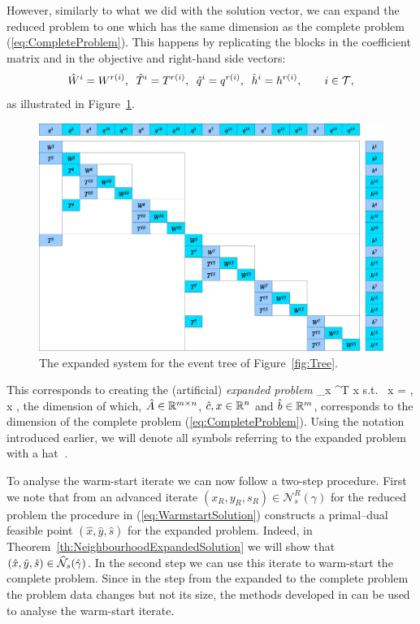 However, similarly to what we did with the solution vector, 
we can expand the reduced problem to one which has the same dimension 
as the complete problem (\ref{eq:CompleteProblem}). This happens by replicating
the blocks in the coefficient matrix and in the objective and right-hand 
side vectors:
\[
  \hat W^i = W^{r(i)},\;\; \hat T^i = T^{r(i)},\;\;
  \hat q^i = q^{r(i)},\;\; \hat h^i = h^{r(i)}, \qquad i \in \mathcal{T},
\]
as illustrated in Figure~\ref{fig:ExpandedSystem}.
%
\begin{figure}[ht]
  \begin{center}
    \includegraphics[scale=.49]{figures/expandedsystem.eps}
    \caption{The expanded system for the event tree of Figure~\ref{fig:Tree}.}
    \label{fig:ExpandedSystem}
  \end{center}
  \vspace{-3ex}
\end{figure}

This corresponds to creating the (artificial) {\em expanded problem}
\be \label{eq:ExpandedProblem}
\min_x\; ^T x \;\quad \mbox{s.t. }\;  x = ,
    \; x ,
\ee
the dimension of which, $\hat{A} \in \mathbb{R}^{m\times n}$, 
$\hat{c}, x \in \mathbb{R}^{n}$ and $\hat{b} \in \mathbb{R}^{m}$,
corresponds to the dimension of the complete problem 
(\ref{eq:CompleteProblem}).
Using the notation introduced earlier, we will denote 
all symbols referring to the expanded problem with a hat $\hat{\ }$.

To analyse the warm-start iterate we can now follow a two-step
procedure. First we note that from an advanced iterate 
$(x_R, y_R,  s_R)\in\mathcal{N}^R_s(\gamma)$ for the reduced
problem the procedure in (\ref{eq:WarmstartSolution}) constructs a
primal--dual feasible point $(\hat{x}, \hat{y}, \hat{s})$ for the 
expanded problem. Indeed,
in Theorem~\ref{th:NeighbourhoodExpandedSolution} we will show that
$(\hat{x}, \hat{y}, \hat{s})\in\widehat{\mathcal{N}}_s(\hat{\gamma})$.
In the second step we
can use this iterate to warm-start the complete problem. Since in the
step from the expanded to the complete problem the problem data
changes but not its size, the methods developed in
\cite{GondzioGrothey03,YildirimWright} can be used to analyse the 
warm-start iterate.

